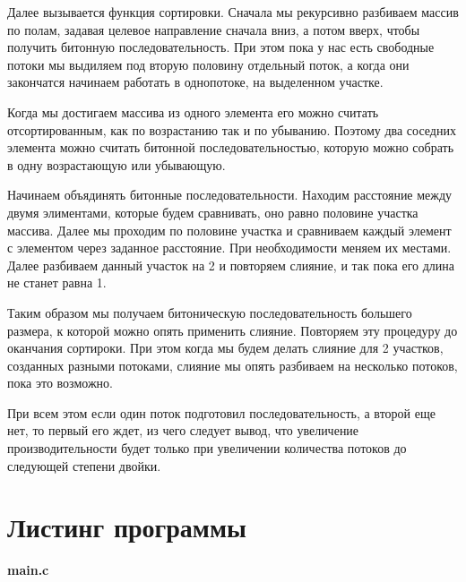 \documentclass[pdf, unicode, 12pt, a4paper,oneside,fleqn]{article}
\begin{document}
Далее вызывается функция сортировки. Сначала мы рекурсивно разбиваем 
массив по полам, задавая целевое направление сначала вниз, а потом вверх, чтобы получить
битонную последовательность. При этом пока у нас есть свободные потоки мы выдиляем под вторую
половину отдельный поток, а когда они закончатся начинаем работать в однопотоке, на выделенном участке.

Когда мы достигаем массива из одного элемента его можно считать отсортированным, как по возрастанию так
и по убыванию. Поэтому два соседних элемента можно считать битонной последовательностью, которую можно собрать в одну
возрастающую или убывающую.

Начинаем объядинять битонные последовательности. Находим расстояние между двумя
элиментами, которые будем сравнивать, оно равно половине участка массива.
Далее мы проходим по половине участка и сравниваем каждый элемент с элементом через заданное расстояние.
При необходимости меняем их местами. Далее разбиваем данный участок на 2 и повторяем слияние, и так пока его длина не станет равна 1.

Таким образом мы получаем битоническую последовательность большего размера, к которой можно опять применить слияние.
Повторяем эту процедуру до оканчания сортироки. При этом когда мы будем делать слияние для 2 участков, созданных
разными потоками, слияние мы опять разбиваем на несколько потоков, пока это возможно.

При всем этом если один поток подготовил последовательность, а второй еще нет, то первый его ждет, из чего
следует вывод, что увеличение производительности будет только при увеличении количества потоков
до следующей степени двойки.

\section{Листинг программы}

{\large\textbf{main.c}}
\end{document}
